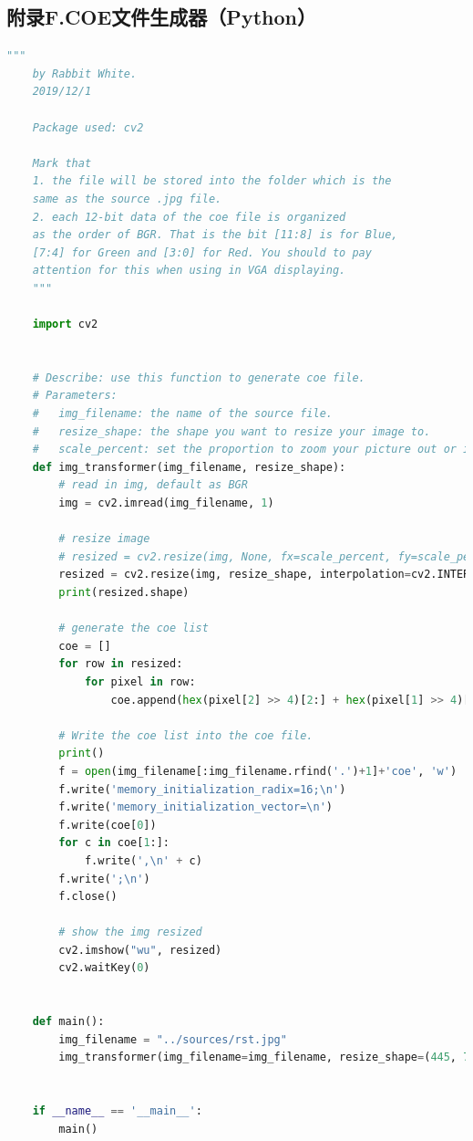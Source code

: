 \documentclass[UTF8]{article}
\begin{document}
	\subsection{附录F.COE文件生成器（Python）}
	\begin{lstlisting}[language=python]
	"""
	by Rabbit White.
	2019/12/1
	
	Package used: cv2
	
	Mark that
	1. the file will be stored into the folder which is the
	same as the source .jpg file.
	2. each 12-bit data of the coe file is organized
	as the order of BGR. That is the bit [11:8] is for Blue,
	[7:4] for Green and [3:0] for Red. You should to pay
	attention for this when using in VGA displaying.
	"""
	
	import cv2
	
	
	# Describe: use this function to generate coe file.
	# Parameters:
	#   img_filename: the name of the source file.
	#   resize_shape: the shape you want to resize your image to.
	#   scale_percent: set the proportion to zoom your picture out or in.
	def img_transformer(img_filename, resize_shape):
		# read in img, default as BGR
		img = cv2.imread(img_filename, 1)
		
		# resize image
		# resized = cv2.resize(img, None, fx=scale_percent, fy=scale_percent, interpolation=cv2.INTER_AREA)
		resized = cv2.resize(img, resize_shape, interpolation=cv2.INTER_AREA)
		print(resized.shape)
		
		# generate the coe list
		coe = []
		for row in resized:
			for pixel in row:
				coe.append(hex(pixel[2] >> 4)[2:] + hex(pixel[1] >> 4)[2:] + hex(pixel[0] >> 4)[2:])
		
		# Write the coe list into the coe file.
		print()
		f = open(img_filename[:img_filename.rfind('.')+1]+'coe', 'w')
		f.write('memory_initialization_radix=16;\n')
		f.write('memory_initialization_vector=\n')
		f.write(coe[0])
		for c in coe[1:]:
			f.write(',\n' + c)
		f.write(';\n')
		f.close()
		
		# show the img resized
		cv2.imshow("wu", resized)
		cv2.waitKey(0)
	
	
	def main():
		img_filename = "../sources/rst.jpg"
		img_transformer(img_filename=img_filename, resize_shape=(445, 71))
	
	
	if __name__ == '__main__':
		main()
	
	\end{lstlisting}
\end{document}
